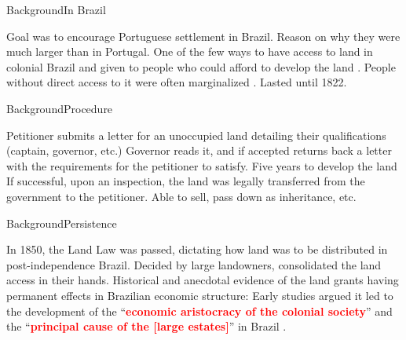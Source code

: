 \documentclass[aspectratio=1610]{beamer}
\begin{document}
\begin{frame}{Background}{In Brazil}
    \begin{outline}
        \1 Goal was to encourage Portuguese settlement in Brazil.
        \vspace{2mm}
            \2 Reason on why they were much larger than in Portugal.
        \vspace{2mm}
        \1 One of the few ways to have access to land in colonial Brazil and given to people who could afford to develop the land \parencites{Smith1944-oi}{Dean1971-iq}.
        \vspace{-1mm}
        \1 People without direct access to it were often marginalized \parencite{Simonsen2005-ps}.
        \vspace{2mm}
        \1 Lasted until 1822.
    \end{outline}    
\end{frame}

\begin{frame}{Background}{Procedure}
    \begin{outline}
        \1 Petitioner submits a letter for an unoccupied land detailing their qualifications (captain, governor, etc.)
        \vspace{2mm}
        \1 Governor reads it, and if accepted returns back a letter with the requirements for the petitioner to satisfy.
        \vspace{2mm}
        \1 Five years to develop the land
        \vspace{2mm}
        \1 If successful, upon an inspection, the land was legally transferred from the government to the petitioner.
        \vspace{2mm}
        \1 Able to sell, pass down as inheritance, etc. 
    \end{outline}
\end{frame}


\begin{frame}{Background}{Persistence}
    \begin{outline}
        \1 In 1850, the Land Law was passed, dictating how land was to be distributed in post-independence Brazil.
        \vspace{2mm}
            \2 Decided by large landowners, consolidated the land access in their hands.
        \vspace{2mm}
        \1 Historical and anecdotal evidence of the land grants having permanent effects in Brazilian economic structure:
        \vspace{2mm}
            \2 Early studies argued it led to the development of the ``\textcolor{red}{\textbf{economic aristocracy of the colonial society}}'' and the ``\textcolor{red}{\textbf{principal cause of the [large estates]}}'' in Brazil \parencites[p.~36]{Lima1954-td}[p.~48]{Da_Costa_Porto1979-dz}. 
    \end{outline}
\end{frame}
\end{document}
